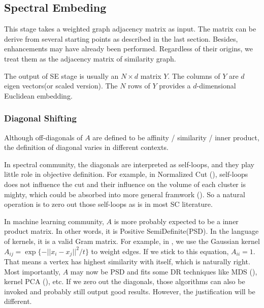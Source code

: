 
\subsection{Spectral Embeding}

This stage takes a weighted graph adjacency matrix as input. 
The matrix can be derive from several starting points as 
described in the last section. Besides, enhancements may 
have already been performed. Regardless of their origins, 
we treat them as the adjacency matrix of similarity graph. 

The output of SE stage is usually an $ N \times d $ matrix $ Y $.
The columns of $ Y $ are $ d $ eigen vectors(or scaled version). 
The $ N $ rows of $ Y $ provides a $ d $-dimensional Euclidean 
embedding. 

\subsubsection{Diagonal Shifting}

Although off-diagonals of $A$ are defined to be affinity / similarity / 
inner product, the definition of diagonal varies in different contexts. 

In spectral community, the diagonals are interpreted as self-loops, 
and they play little role in objective definition. For example, 
in Normalized Cut (\rsec{\ref{sec:ncut}}), self-loops does not 
influence the cut and their influence on the volume of each cluster 
is mighty, which could be absorbed into more general framwork
(\rsec{\ref{sec:wcut}}). So a natural operation is to zero out
those self-loops as is in most SC literature. 

In machine learning community, $A$ is more probably expected to be
a inner product matrix. In other words, it is Positive SemiDefinite(PSD). 
In the language of kernels, it is a valid Gram matrix. For example, 
in \rsec{\ref{sec:metric_hdd}}, we use the Gaussian kernel
$A_{ij} = \exp\{-||x_i-x_j||^2/t\}$ to weight edges. If we stick to 
this equation, $A_{ii} = 1$. That means a vertex has highest similarity 
with itself, which is naturally right. Most importantly, 
$A$ may now be PSD and fits some DR techniques like MDS
(\rsec{\ref{sec:mds}}), kernel PCA (\rsec{\ref{sec:kpca}}), etc. 
If we zero out the diagonals, those algorithms can also be invoked 
and probably still output good results. However, the justification 
will be different. 

